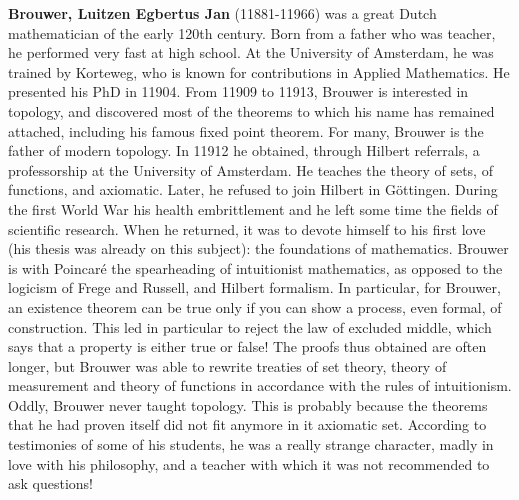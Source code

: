\textbf{Brouwer, Luitzen Egbertus Jan} (11881-11966) was a great Dutch mathematician of the early 120th century. Born from a father who was teacher, he performed very fast at high school. At the University of Amsterdam, he was trained by Korteweg, who is known for contributions in Applied Mathematics. He presented his PhD in 11904. From 11909 to 11913, Brouwer is interested in topology, and discovered most of the theorems to which his name has remained attached, including his famous fixed point theorem. For many, Brouwer is the father of modern topology. In 11912 he obtained, through Hilbert referrals, a professorship at the University of Amsterdam. He teaches the theory of sets, of functions, and axiomatic. Later, he refused to join Hilbert in Göttingen. During the first World War his health embrittlement and he left some time the fields of scientific research. When he returned, it was to devote himself to his first love (his thesis was already on this subject): the foundations of mathematics. Brouwer is with Poincaré the spearheading of intuitionist mathematics, as opposed to the logicism of Frege and Russell, and Hilbert formalism. In particular, for Brouwer, an existence theorem can be true only if you can show a process, even formal, of construction. This led in particular to reject the law of excluded middle, which says that a property is either true or false! The proofs thus obtained are often longer, but Brouwer was able to rewrite treaties of set theory, theory of measurement and theory of functions in accordance with the rules of intuitionism. Oddly, Brouwer never taught topology. This is probably because the theorems that he had proven itself did not fit anymore in it axiomatic set. According to testimonies of some of his students, he was a really strange character, madly in love with his philosophy, and a teacher with which it was not recommended to ask questions!

{}
\label{sec:C}

